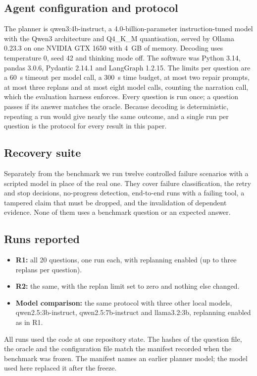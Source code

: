 \subsection{Agent configuration and protocol}
The planner is qwen3:4b-instruct, a 4.0-billion-parameter instruction-tuned model with the Qwen3 architecture and Q4\_K\_M quantisation, served by Ollama 0.23.3 on one NVIDIA GTX 1650 with 4~GB of memory. Decoding uses temperature 0, seed 42 and thinking mode off. The software was Python 3.14, pandas 3.0.6, Pydantic 2.14.1 and LangGraph 1.2.15. The limits per question are a 60~s timeout per model call, a 300~s time budget, at most two repair prompts, at most three replans and at most eight model calls, counting the narration call, which the evaluation harness enforces. Every question is run once; a question passes if its answer matches the oracle. Because decoding is deterministic, repeating a run would give nearly the same outcome, and a single run per question is the protocol for every result in this paper.

\subsection{Recovery suite}
Separately from the benchmark we run twelve controlled failure scenarios with a scripted model in place of the real one. They cover failure classification, the retry and stop decisions, no-progress detection, end-to-end runs with a failing tool, a tampered claim that must be dropped, and the invalidation of dependent evidence. None of them uses a benchmark question or an expected answer.

\subsection{Runs reported}
\begin{itemize}
\item \textbf{R1:} all 20 questions, one run each, with replanning enabled (up to three replans per question).
\item \textbf{R2:} the same, with the replan limit set to zero and nothing else changed.
\item \textbf{Model comparison:} the same protocol with three other local models, qwen2.5:3b-instruct, qwen2.5:7b-instruct and llama3.2:3b, replanning enabled as in R1.
\end{itemize}
All runs used the code at one repository state. The hashes of the question file, the oracle and the configuration file match the manifest recorded when the benchmark was frozen. The manifest names an earlier planner model; the model used here replaced it after the freeze.
